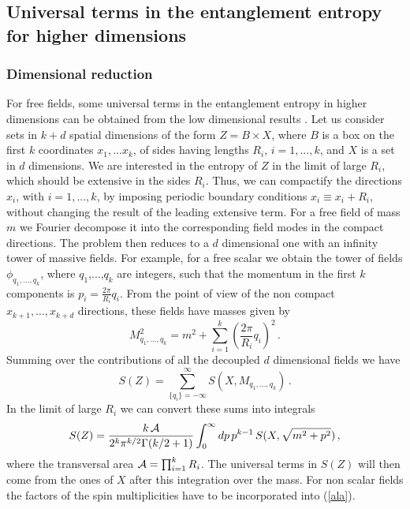 \documentclass[a4paper]{article}
\begin{document}
\subsection{Universal terms in the entanglement entropy for higher dimensions}
\subsubsection{Dimensional reduction}
For free fields, some universal terms in the entanglement entropy in higher dimensions can be obtained from the low dimensional results \cite{boson}. Let us consider sets in $k+d$ spatial dimensions of the form $Z=B\times X$, where $B$ is a box on the first $k$ coordinates $x_1,...x_k$, of sides having lengths $R_i$, $i=1,...,k$, and $X$ is a set in $d$ dimensions. 
We are interested in the entropy of $Z$ in the limit of large $R_i$, which should be extensive in the sides $R_i$. Thus, we can compactify the directions $x_i$, with $i=1,...,k$, by imposing periodic boundary conditions $x_i\equiv x_i+R_i$, without changing the result of the leading extensive term. For a free field of mass $m$ we Fourier decompose it into the corresponding field modes in the compact directions. The problem then reduces to a $d$ dimensional one with an infinity tower of massive fields. For example, for a free scalar we obtain the tower of fields $\phi_{q_1, ..., q_{k}}$, where $q_1$,...,$q_{k}$ are integers, such that the momentum in the first $k$ components is $p_i=\frac{2\pi}{R_i}q_i$. 
From the point of view of the non compact $x_{k+1},..., x_{k+d}$ directions, these fields have masses given by 
\begin{equation}
M_{q_1, ..., q_{k}}^2=m^2+\sum_{i=1}^{k} \left(\frac{2\pi}{R_i}q_i \right) ^2\,. 
\end{equation}
Summing over the contributions of all the decoupled $d$ dimensional fields we have
\begin{equation}
S(Z)=\sum_{\{q_i\}=-\infty}^\infty S(X,M_{q_1, ..., q_{k}})\,.
\end{equation}
In the limit of large $R_i$ we can convert these sums into integrals
\begin{equation}
S(Z)= \frac{k\,{\cal A}}{2^{k}\pi^{k/2}\Gamma(k/2+1)}\int_0^\infty dp\, p^{k-1}\, S(X,\sqrt{m^2+p^2})\,,\label{ala}
\end{equation}
where the transversal area ${\cal A}=\prod_{i=1}^k R_i$.
The universal terms in $S(Z)$ will then come from the ones of $X$ after this integration over the mass. For non scalar fields the factors of the spin multiplicities have to be incorporated into (\ref{ala}).  
\end{document}
